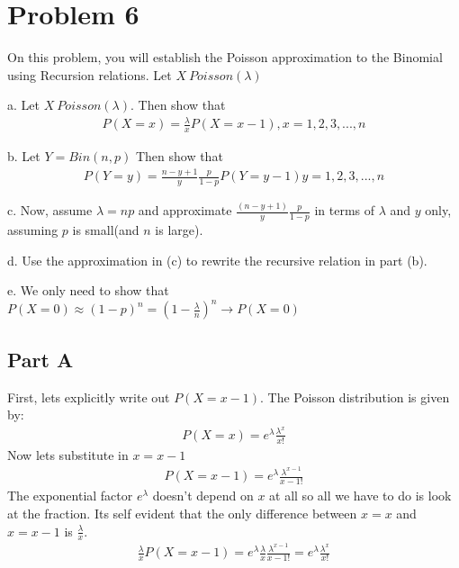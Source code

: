 \documentclass{article}
\begin{document}
\section*{Problem 6}
On this problem, you will establish the Poisson approximation to the Binomial using Recursion relations. Let $X~Poisson(\lambda)$

a. Let $X~Poisson(\lambda)$. Then show that
\begin{align*}
P(X=x) = \frac{\lambda}{x} P(X=x-1), x=1,2,3,...,n
\end{align*}

b. Let $Y=Bin(n,p)$ Then show that
\begin{align*}
P(Y=y) = \frac{n-y+1}{y} \frac{p}{1-p} P(Y=y-1) y=1,2,3,...,n
\end{align*}

c. Now, assume $\lambda = n p$ and approximate $\frac{(n-y+1)}{y} \frac{p}{1-p}$ in terms of $\lambda$ and $y$ only, assuming $p$ is small(and $n$ is large).

d. Use the approximation in (c) to rewrite the recursive relation in part (b).

e. We only need to show that $P(X=0)\approx (1-p)^n = (1-\frac{\lambda}{n})^n \rightarrow P(X=0)$

\subsection*{Part A}
First, lets explicitly write out $P(X=x-1)$. The Poisson distribution is given by:
\begin{align*}
P(X=x) = e^{\lambda} \frac{\lambda^x}{x!}
\end{align*}
Now lets substitute in $x=x-1$
\begin{align*}
P(X=x-1) = e^{\lambda} \frac{\lambda^{x-1}}{{x-1}!}
\end{align*}
The exponential factor $e^\lambda$ doesn't depend on $x$ at all so all we have to do is look at the fraction. Its self evident that the only difference between $x=x$ and $x=x-1$ is $\frac{\lambda}{x}$.
\begin{align*}
\frac{\lambda}{x} P(X=x-1) = e^{\lambda} \frac{\lambda}{x} \frac{\lambda^{x-1}}{{x-1}!} = e^{\lambda} \frac{\lambda^x}{x!}
\end{align*}
\end{document}
